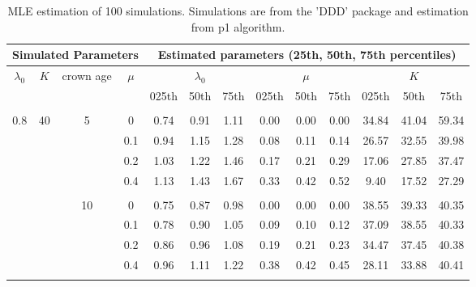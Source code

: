 \documentclass[11pt]{beamer}
\begin{document}
\begin{frame}
\begin{table}[h!]
{\caption{MLE estimation of 100 simulations. Simulations are from the 'DDD' package and estimation from p1 algorithm.}
\label{ddd}
\begin{tabular}{cccc|ccc@{\hskip 0.2in}ccc@{\hskip 0.2in}ccc}
\hline
\multicolumn{4}{c}{Simulated Parameters} & \multicolumn{9}{c}{Estimated parameters (25th, 50th, 75th percentiles)} \\ \hline
$\lambda_0$     & $K$     & crown age    & $\mu$     &   &  $\lambda_0$     &       &      &  $\mu$     &       &      &  $K$     &       \\
           &       &              &        & 025th   & 50th  & 75th  & 025th  & 50th  & 75th  & 025th & 50th  & 75th  \\
            &       &              &       &        &         &       &       &      &      &       &       &        \\ 
0.8        & 40    & 5            & 0      & 0.74    & 0.91  & 1.11  & 0.00   & 0.00  & 0.00  & 34.84 & 41.04 & 59.34 \\
           &       &              & 0.1    & 0.94    & 1.15  & 1.28  & 0.08   & 0.11  & 0.14  & 26.57 & 32.55 & 39.98 \\
           &       &              & 0.2    & 1.03    & 1.22  & 1.46  & 0.17   & 0.21  & 0.29  & 17.06 & 27.85 & 37.47 \\
           &       &              & 0.4    & 1.13    & 1.43  & 1.67  & 0.33   & 0.42  & 0.52  & 9.40  & 17.52 & 27.29 \\
           &       &              &        &         &       &       &        &       &       &       &       &       \\
           &       & 10           & 0      & 0.75    & 0.87  & 0.98  & 0.00   & 0.00  & 0.00  & 38.55 & 39.33 & 40.35 \\
           &       &              & 0.1    & 0.78    & 0.90  & 1.05  & 0.09   & 0.10  & 0.12  & 37.09 & 38.55 & 40.33 \\
           &       &              & 0.2    & 0.86    & 0.96  & 1.08  & 0.19   & 0.21  & 0.23  & 34.47 & 37.45 & 40.38 \\
           &       &              & 0.4    & 0.96    & 1.11  & 1.22  & 0.38   & 0.42  & 0.45  & 28.11 & 33.88 & 40.41 \\
           &       &              &        &         &       &       &        &       &       &       &       &       \\

\end{tabular}}
\end{table}
\end{frame}
\end{document}

